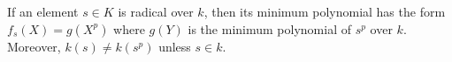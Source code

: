 If an element $s \in K$ is radical over $k$, then its minimum polynomial has the form $f_s(X) = g(X^p)$ where $g(Y)$ is the minimum polynomial of $s^p$ over $k$. Moreover, $k(s) \neq k(s^p)$ unless $s \in k$.
